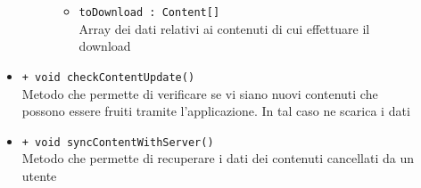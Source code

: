 \documentclass[../Tesi.tex]{subfiles}
\begin{document}
\begin{description}
\begin{itemize}
\begin{description}
\begin{itemize}
						\item \texttt{toDownload : Content[]}\\
						Array dei dati relativi ai contenuti di cui effettuare il download						
					\end{itemize}
				\end{description}

				\item \texttt{+ void checkContentUpdate()}\\
				Metodo che permette di verificare se vi siano nuovi contenuti che possono essere fruiti tramite l'applicazione. In tal caso ne scarica i dati
				
				\item \texttt{+ void syncContentWithServer()}\\
				Metodo che permette di recuperare i dati dei contenuti cancellati da un utente
			\end{itemize}
		\end{description}
\end{document}
